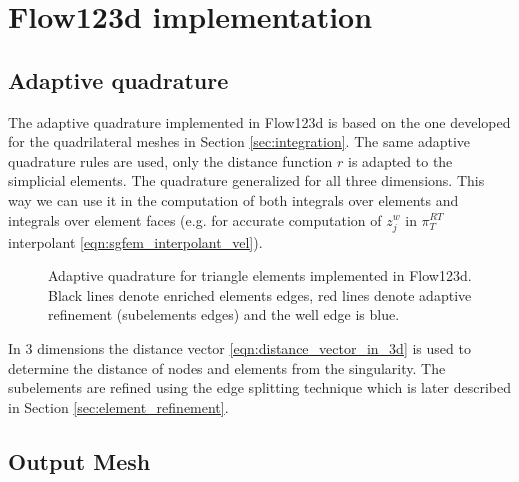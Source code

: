

\section{Flow123d implementation}

\subsection{Adaptive quadrature}
The adaptive quadrature implemented in Flow123d is based on the one developed for the quadrilateral meshes
in Section \ref{sec:integration}. The same adaptive quadrature rules are used, only the distance function $r$
is adapted to the simplicial elements. The quadrature generalized for all three dimensions.
This way we can use it in the computation of both integrals over elements and integrals
over element faces (e.g. for accurate computation of $z^w_j$ in $\pi^{RT}_T$ interpolant \eqref{eqn:sgfem_interpolant_vel}).

\begin{figure}[!htb]
  \centering    
  \hspace{0pt}
  \caption[Adaptive quadrature in Flow123d]
  {Adaptive quadrature for triangle elements implemented in Flow123d.
   Black lines denote enriched elements edges, red lines denote adaptive refinement (subelements edges) and the well
   edge is blue.
  }
  \label{fig:adapt_refinement_flow123d}
\end{figure}

In 3 dimensions the distance vector \eqref{eqn:distance_vector_in_3d} is used to determine the distance of nodes and elements from the singularity.
The subelements are refined using the edge splitting technique which is later described in Section \ref{sec:element_refinement}.

\subsection{Output Mesh}
\label{sec:output_mesh}

